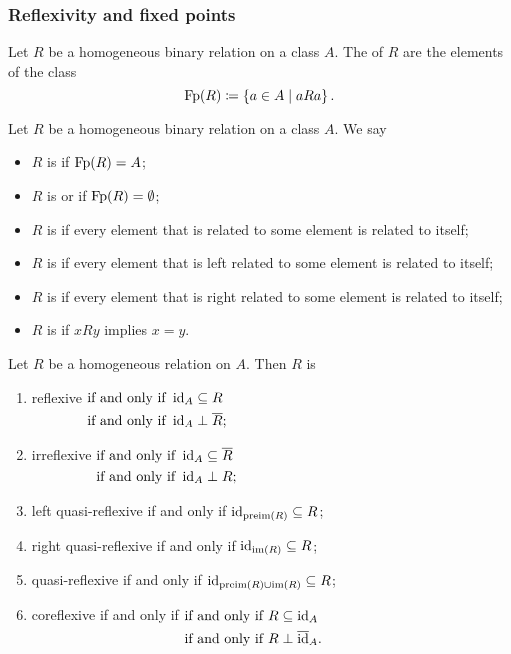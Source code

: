 \subsubsection{Reflexivity and fixed points}
\begin{definition}
Let $R$ be a homogeneous binary relation on a class $A$. The  of $R$ are the elements of the class
\[ \operatorname{Fp}(R) \coloneqq \left\{ a\in A \;\middle|\; aRa \right\}. \]
\end{definition}


\begin{definition}
Let $R$ be a homogeneous binary relation on a class $A$. We say
\begin{itemize}
\item $R$ is  if $\operatorname{Fp}(R) = A$;
\item $R$ is  or  if $\operatorname{Fp}(R) = \emptyset$;
\item $R$ is  if every element that is related to some element is related to itself;
\item $R$ is  if every element that is left related to some element is related to itself;
\item $R$ is  if every element that is right related to some element is related to itself;
\item $R$ is  if $xRy$ implies $x=y$.
\end{itemize}
\end{definition}

\begin{lemma}
Let $R$ be a homogeneous relation on $A$. Then $R$ is
\begin{enumerate}
\item reflexive $\begin{aligned}[t]
&\text{\textup{if and only if}}\; \operatorname{id}_A \subseteq R \\
&\text{\textup{if and only if}}\; \operatorname{id}_A \perp \overline{R};
\end{aligned}$
\item irreflexive $\begin{aligned}[t]
&\text{\textup{if and only if}}\; \operatorname{id}_A \subseteq \overline{R} \\
&\text{\textup{if and only if}}\; \operatorname{id}_A \perp R;
\end{aligned}$
\item left quasi-reflexive \textup{if and only if} $\operatorname{id}_{\operatorname{preim}(R)} \subseteq R$;
\item right quasi-reflexive \textup{if and only if} $\operatorname{id}_{\operatorname{im}(R)} \subseteq R$;
\item quasi-reflexive \textup{if and only if} $\operatorname{id}_{\operatorname{preim}(R)\cup \operatorname{im}(R)} \subseteq R$;
\item coreflexive \textup{if and only if} $\begin{aligned}[t]
&\text{\textup{if and only if}}\; R \subseteq \operatorname{id}_A \\
&\text{\textup{if and only if}}\; R \perp \overline{\operatorname{id}}_A.
\end{aligned}$
\end{enumerate}
\end{lemma}

